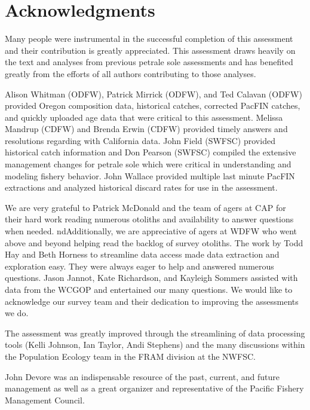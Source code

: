\documentclass[12pt,]{article}
\begin{document}
\section{Acknowledgments}\label{acknowledgments}

Many people were instrumental in the successful completion of this
assessment and their contribution is greatly appreciated. This
assessment draws heavily on the text and analyses from previous petrale
sole assessments and has benefited greatly from the efforts of all
authors contributing to those analyses.

Alison Whitman (ODFW), Patrick Mirrick (ODFW), and Ted Calavan (ODFW)
provided Oregon composition data, historical catches, corrected PacFIN
catches, and quickly uploaded age data that were critical to this
assessment. Melissa Mandrup (CDFW) and Brenda Erwin (CDFW) provided
timely answers and resolutions regarding with California data. John
Field (SWFSC) provided historical catch information and Don Pearson
(SWFSC) compiled the extensive management changes for petrale sole which
were critical in understanding and modeling fishery behavior. John
Wallace provided multiple last minute PacFIN extractions and analyzed
historical discard rates for use in the assessment.

We are very grateful to Patrick McDonald and the team of agers at CAP
for their hard work reading numerous otoliths and availability to answer
questions when needed. ndAdditionally, we are appreciative of agers at
WDFW who went above and beyond helping read the backlog of survey
otoliths. The work by Todd Hay and Beth Horness to streamline data
access made data extraction and exploration easy. They were always eager
to help and answered numerous questions. Jason Jannot, Kate Richardson,
and Kayleigh Sommers assisted with data from the WCGOP and entertained
our many questions. We would like to acknowledge our survey team and
their dedication to improving the assessments we do.

The assessment was greatly improved through the streamlining of data
processing tools (Kelli Johnson, Ian Taylor, Andi Stephens) and the many
discussions within the Population Ecology team in the FRAM division at
the NWFSC.

John Devore was an indispensable resource of the past, current, and
future management as well as a great organizer and representative of the
Pacific Fishery Management Council.

\newpage

\FloatBarrier
\end{document}
